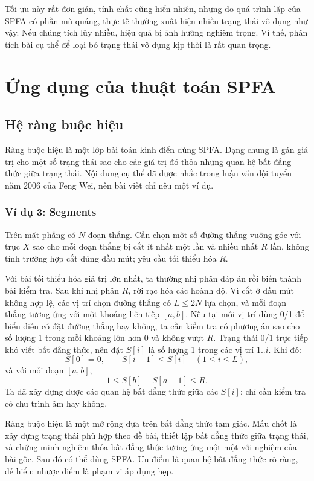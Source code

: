 \documentclass[11pt]{article}
\begin{document}
Tối ưu này rất đơn giản, tính chất cũng hiển nhiên, nhưng do quá trình lặp của
SPFA có phần mù quáng, thực tế thường xuất hiện nhiều trạng thái vô dụng như
vậy. Nếu chúng tích lũy nhiều, hiệu quả bị ảnh hưởng nghiêm trọng. Vì thế,
phân tích bài cụ thể để loại bỏ trạng thái vô dụng kịp thời là rất quan
trọng.

\section{Ứng dụng của thuật toán SPFA}

\subsection{Hệ ràng buộc hiệu}

Ràng buộc hiệu là một lớp bài toán kinh điển dùng SPFA. Dạng chung là gán giá
trị cho một số trạng thái sao cho các giá trị đó thỏa những quan hệ bất đẳng
thức giữa trạng thái. Nội dung cụ thể đã được nhắc trong luận văn đội tuyển
năm 2006 của Feng Wei, nên bài viết chỉ nêu một ví dụ.

\subsubsection*{Ví dụ 3: Segments}

Trên mặt phẳng có \(N\) đoạn thẳng. Cần chọn một số đường thẳng vuông góc với
trục \(X\) sao cho mỗi đoạn thẳng bị cắt ít nhất một lần và nhiều nhất \(R\)
lần, không tính trường hợp cắt đúng đầu mút; yêu cầu tối thiểu hóa \(R\).

Với bài tối thiểu hóa giá trị lớn nhất, ta thường nhị phân đáp án rồi biến
thành bài kiểm tra. Sau khi nhị phân \(R\), rời rạc hóa các hoành độ. Vì cắt
ở đầu mút không hợp lệ, các vị trí chọn đường thẳng có \(L\le 2N\) lựa chọn,
và mỗi đoạn thẳng tương ứng với một khoảng liên tiếp \([a,b]\). Nếu tại mỗi
vị trí dùng 0/1 để biểu diễn có đặt đường thẳng hay không, ta cần kiểm tra có
phương án sao cho số lượng 1 trong mỗi khoảng lớn hơn 0 và không vượt \(R\).
Trạng thái 0/1 trực tiếp khó viết bất đẳng thức, nên đặt \(S[i]\) là số lượng
1 trong các vị trí \(1..i\). Khi đó:
\[
  S[0]=0,\qquad S[i-1]\le S[i]\quad (1\le i\le L),
\]
và với mỗi đoạn \([a,b]\),
\[
  1\le S[b]-S[a-1]\le R.
\]
Ta đã xây dựng được các quan hệ bất đẳng thức giữa các \(S[i]\); chỉ cần kiểm
tra có chu trình âm hay không.

Ràng buộc hiệu là một mở rộng dựa trên bất đẳng thức tam giác. Mấu chốt là
xây dựng trạng thái phù hợp theo đề bài, thiết lập bất đẳng thức giữa trạng
thái, và chứng minh nghiệm thỏa bất đẳng thức tương ứng một-một với nghiệm
của bài gốc. Sau đó có thể dùng SPFA. Ưu điểm là quan hệ bất đẳng thức rõ
ràng, dễ hiểu; nhược điểm là phạm vi áp dụng hẹp.
\end{document}
